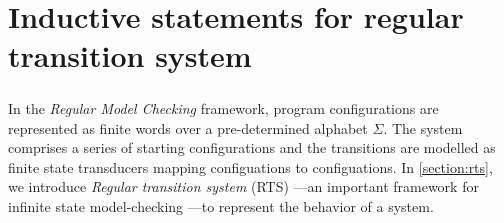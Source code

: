 \chapter{Inductive statements for regular transition system}\label{chapter:inductive_statement}
\paragraph*{}
In the \textit{Regular Model Checking} framework, program configurations are 
represented as finite words over a pre-determined alphabet $\Sigma$.
The system comprises a series of starting configurations and the transitions
are modelled as finite state transducers
mapping configuations to configuations.
In \autoref{section:rts}, we introduce \textit{Regular transition system} (RTS)
—an important framework for infinite state model-checking
—to represent the behavior of a system.

